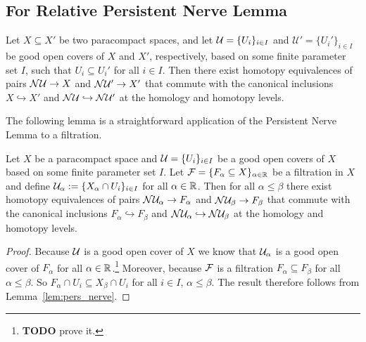 %
%

\subsection{For Relative Persistent Nerve Lemma}

\begin{lemma}\label{lem:pers_nerve}
  Let $X\subseteq X'$ be two paracompact spaces, and let $\mathcal{U} = \{U_i\}_{i\in I}$ and $\mathcal{U}' = \{U_i'\}_{i\in I}$ be good open covers of $X$ and $X'$, respectively, based on some finite parameter set $I$, such that $U_i\subseteq U_i'$ for all $i\in I$.
  Then there exist homotopy equivalences of pairs $\mathcal{N}\mathcal{U}\to X$ and $\mathcal{N}\mathcal{U}'\to X'$ that commute with the canonical inclusions $X \hookrightarrow X'$ and $\mathcal{N}\mathcal{U}\hookrightarrow \mathcal{N}\mathcal{U}'$ at the homology and homotopy levels.
\end{lemma}

The following lemma is a straightforward application of the Persistent Nerve Lemma to a filtration.

\begin{lemma}\label{lem:pers_nerve_filt}
  Let $X$ be a paracompact space and $\mathcal{U} = \{U_i\}_{i\in I}$ be a good open covers of $X$ based on some finite parameter set $I$.
  Let $\mathcal{F} = \{F_\alpha\subseteq X\}_{\alpha\in\mathbb{R}}$ be a filtration in $X$ and define $\mathcal{U}_\alpha := \{X_\alpha\cap U_i\}_{i\in I}$ for all $\alpha\in\mathbb{R}$.
  Then for all $\alpha\leq\beta$ there exist homotopy equivalences of pairs $\mathcal{N}\mathcal{U}_\alpha\to F_\alpha$ and $\mathcal{N}\mathcal{U}_\beta\to F_\beta$ that commute with the canonical inclusions $F_\alpha \hookrightarrow F_\beta$ and $\mathcal{N}\mathcal{U}_\alpha\hookrightarrow \mathcal{N}\mathcal{U}_\beta$ at the homology and homotopy levels.
\end{lemma}
\begin{proof}
  Because $\mathcal{U}$ is a good open cover of $X$ we know that $\mathcal{U}_\alpha$ is a good open cover of $F_\alpha$ for all $\alpha\in\mathbb{R}$.\footnote{\textbf{TODO} prove it.}
  Moreover, because $\mathcal{F}$ is a filtration $F_\alpha\subseteq F_\beta$ for all $\alpha\leq\beta$.
  So $F_\alpha\cap U_i\subseteq X_\beta\cap U_i$ for all $i\in I$, $\alpha\leq\beta$.
  The result therefore follows from Lemma~\ref{lem:pers_nerve}.
\end{proof}


